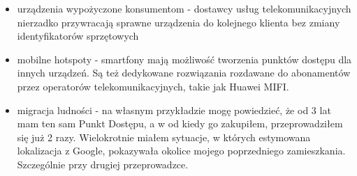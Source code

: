 \begin{itemize}
    \item urządzenia wypożyczone konsumentom - dostawcy usług telekomunikacyjnych nierzadko przywracają sprawne urządzenia do kolejnego klienta bez zmiany identyfikatorów sprzętowych 
    \item mobilne hotspoty - smartfony mają możliwość tworzenia punktów dostępu dla innych urządzeń. Są też dedykowane rozwiązania rozdawane do abonamentów przez operatorów telekomunikacyjnych, takie jak Huawei MIFI.
    \item migracja ludności - na własnym przykładzie mogę powiedzieć, że od 3 lat mam ten sam Punkt Dostępu, a w od kiedy go zakupiłem, przeprowadziłem się już 2 razy. Wielokrotnie miałem sytuacje, w których estymowana lokalizacja z Google, pokazywała okolice mojego poprzedniego zamieszkania. Szczególnie przy drugiej przeprowadzce.
\end{itemize}






